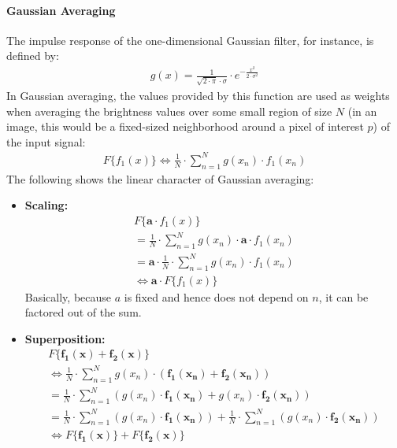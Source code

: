\documentclass[a4paper,twocolumn]{article}
\begin{document}
	\paragraph{Gaussian Averaging} The impulse response of the one-dimensional Gaussian filter, for instance, is defined by:
	\begin{align*}
	g(x) = \frac{1}{\sqrt{2 \cdot \pi} \cdot \sigma} \cdot e^{-\frac{x^2}{2 \cdot \sigma^2}}
	\end{align*}
	In Gaussian averaging, the values provided by this function are used as weights when averaging the brightness values over some small region of size $N$ (in an image, this would be a fixed-sized neighborhood around a pixel of interest $p$) of the input signal:
	\begin{align*}
	F\{f_1(x)\} \Leftrightarrow \frac{1}{N} \cdot \sum_{n=1}^{N} g(x_n) \cdot f_1(x_n)
	\end{align*}
	The following shows the linear character of Gaussian averaging:
	\begin{itemize}
		\item \textbf{Scaling:}
		\begin{align*}
		F\{\mathbf{a} \cdot f_1(x)\} \\
		=
		\frac{1}{N} \cdot \sum_{n=1}^{N} g(x_n) \cdot \mathbf{a} \cdot f_1(x_n) \\
		=
		\mathbf{a} \cdot \frac{1}{N} \cdot \sum_{n=1}^{N} g(x_n) \cdot f_1(x_n) \\
		\Leftrightarrow \mathbf{a} \cdot F\{f_1(x)\} 
		\end{align*}
		Basically, because $a$ is fixed and hence does not depend on $n$, it can be factored out of the sum.
		\item \textbf{Superposition:}
		\begin{align*}
		F\{\mathbf{f_1(x)} + \mathbf{f_2(x)}\} \\
		\Leftrightarrow
		\frac{1}{N} \cdot \sum_{n=1}^{N} g(x_n) \cdot (\mathbf{f_1(x_n)} + \mathbf{f_2(x_n)}) \\
		=
		\frac{1}{N} \cdot \sum_{n=1}^{N} (g(x_n) \cdot \mathbf{f_1(x_n)} + g(x_n) \cdot \mathbf{f_2(x_n)}) \\
		=
		\frac{1}{N} \cdot \sum_{n=1}^{N} (g(x_n) \cdot \mathbf{f_1(x_n)}) + \frac{1}{N} \cdot \sum_{n=1}^{N} (g(x_n) \cdot \mathbf{f_2(x_n)}) \\
		\Leftrightarrow F\{\mathbf{f_1(x)}\} + F\{\mathbf{f_2(x)}\} 
		\end{align*}
	\end{itemize}
	
\end{document}
